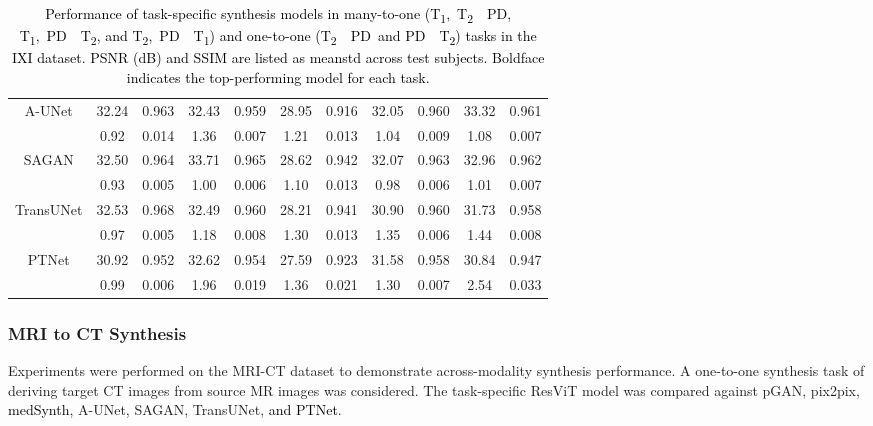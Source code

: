\documentclass[journal,twoside,web]{ieeecolor}
\newcommand{\TtwoPD}{T\textsubscript{2}~~PD}
\newcommand{\PDTtwo}{PD~~T\textsubscript{2}}
\newcommand{\TtwoPDTone}{T\textsubscript{2},~PD~~T\textsubscript{1}}
\newcommand{\TonePDTtwo}{T\textsubscript{1},~PD~~T\textsubscript{2}}
\newcommand{\ToneTtwoPD}{T\textsubscript{1},~T\textsubscript{2}~~PD}
\newcommand*{\revhl}{\textcolor{black}}
\begin{document}
\begin{table}[]
{\begin{tabular}{ccccccccccc}
\multirow{2}{*}{A-UNet}    &        32.24   &   0.963       &  32.43         &      0.959    &      28.95     & 0.916 &      32.05     & 0.960
&      33.32     & 0.961\\
                           &    0.92       &  0.014        &  1.36            &   0.007       &   1.21        &     0.013 &   1.04        &     0.009 &   1.08        &     0.007         \\ \hline
\multirow{2}{*}{SAGAN}     &     32.50      &   0.964       &   33.71        &      0.965    &      28.62     &     0.942 &      32.07     &     0.963&      32.96     &     0.962    \\
                           &    0.93      &  0.005        &  1.00         &   0.006      &   1.10        &     0.013   &   0.98        &     0.006 &   1.01        &     0.007        \\ \hline
\multirow{2}{*}{TransUNet} &      32.53     &   0.968       &   32.49        &  0.960        &      28.21     & 0.941  &      30.90     & 0.960 &      31.73     & 0.958        \\
                          &    0.97       &  0.005        &  1.18         &   0.008       &   1.30        &     0.013   &   1.35        &     0.006&   1.44        &     0.008      \\ \hline
                          
                          
                          
\multirow{2}{*}{PTNet} &      30.92     &   0.952       &   32.62        &  0.954        &      27.59     & 0.923   &      31.58     & 0.958  &      30.84     & 0.947        \\
                          &     0.99       &  0.006        &  1.96         &   0.019       &   1.36        &     0.021   &   1.30        &     0.007 &   2.54        &     0.033       \\ \hline
\end{tabular}
}
\caption{\revhl{Performance of task-specific synthesis models in many-to-one (\ToneTtwoPD, \TonePDTtwo, and \TtwoPDTone) and one-to-one (\TtwoPD~and \PDTtwo) tasks in the IXI dataset. PSNR (dB) and SSIM are listed as meanstd across test subjects. Boldface indicates the top-performing model for each task.}}
\label{tab:ixi_many}
\vspace{-2ex}
\end{table}

\subsubsection{MRI to CT Synthesis}
Experiments were performed on the MRI-CT dataset to demonstrate across-modality synthesis performance. A one-to-one synthesis task of deriving target CT images from source MR images was considered. The task-specific ResViT model was compared against pGAN, pix2pix, \revhl{medSynth}, A-UNet, SAGAN, TransUNet, \revhl{and PTNet}.
\end{document}
